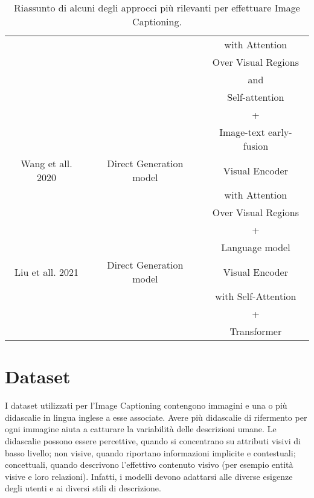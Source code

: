 \begin{table}[H]
\begin{center}
\begin{tabular}{||c c c||}
     			    ~						   &              ~          & with Attention \\
  					~						   &              ~          & Over Visual Regions \\
  					~						   &              ~          & and  \\
  					~						   &              ~          & Self-attention \\
  					~						   &              ~          & + \\
  					~						   &              ~          & Image-text early-fusion \\
 \hline
 Wang et all. \cite{wang2020visual} 2020       & Direct Generation model & Visual Encoder \\
      			    ~						   &              ~          & with Attention \\
  					~						   &              ~          & Over Visual Regions \\
  					~						   &              ~          & + \\
  					~						   &              ~          & Language model \\
 \hline
  Liu et all. \cite{liu2021cptr} 2021          & Direct Generation model & Visual Encoder  \\
        			~						   &              ~          & with  Self-Attention \\
  					~						   &              ~          & + \\
  					~						   &              ~          & Transformer \\
 \hline
\end{tabular}
\caption{Riassunto di alcuni degli approcci più rilevanti per effettuare Image Captioning.}
\label{table:1}
\end{center}
\end{table}
\newpage


\section{Dataset}
I dataset utilizzati per l'Image Captioning contengono immagini e una o più didascalie in lingua inglese a esse associate. Avere più didascalie di rifermento per ogni immagine aiuta a catturare la variabilità delle descrizioni umane. Le didascalie possono essere percettive, quando si concentrano su attributi visivi di basso livello; non visive, quando riportano informazioni implicite e contestuali; concettuali, quando descrivono l'effettivo contenuto visivo (per esempio entità visive e loro relazioni).
Infatti, i modelli devono adattarsi alle diverse esigenze degli utenti e ai diversi stili di descrizione. 


